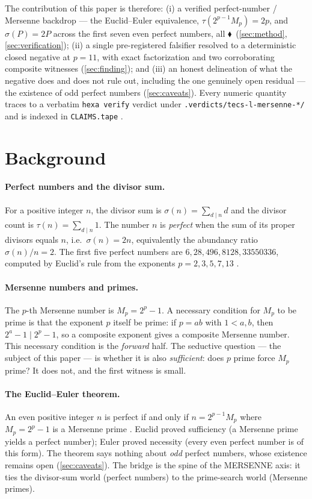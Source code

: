 \documentclass[11pt,a4paper]{article}
\newcommand{\tierF}{\textcolor{blue!60!black}{$\blacklozenge$}}   %
\newcommand{\sig}{\sigma}
\newcommand{\Mp}{M_p}
\theoremstyle{definition}
\begin{document}
The contribution of this paper is therefore: (i) a verified perfect-number /
Mersenne backdrop --- the Euclid--Euler equivalence, $\tau(2^{p-1}\Mp)=2p$, and
$\sig(P)=2P$ across the first seven even perfect numbers, all \tierF\
(\textsection\ref{sec:method}, \textsection\ref{sec:verification}); (ii) a single
pre-registered falsifier resolved to a deterministic closed negative at $p=11$,
with exact factorization and two corroborating composite witnesses
(\textsection\ref{sec:finding}); and (iii) an honest delineation of what the
negative does and does not rule out, including the one genuinely open residual
--- the existence of odd perfect numbers (\textsection\ref{sec:caveats}). Every
numeric quantity traces to a verbatim \texttt{hexa verify} verdict under
\texttt{.verdicts/tecs-l-mersenne-*/} and is indexed in \texttt{CLAIMS.tape}
\citep{tecs-l-claims}.

\section{Background}
\label{sec:background}

\paragraph{Perfect numbers and the divisor sum.} For a positive integer $n$, the
divisor sum is $\sig(n)=\sum_{d\mid n} d$ and the divisor count is
$\tau(n)=\sum_{d\mid n} 1$. The number $n$ is \emph{perfect} when the sum of its
proper divisors equals $n$, i.e.\ $\sig(n)=2n$, equivalently the abundancy ratio
$\sig(n)/n = 2$. The first five perfect numbers are
$6, 28, 496, 8128, 33550336$, computed by Euclid's rule from the exponents
$p = 2,3,5,7,13$ \citep{hardy-wright}.

\paragraph{Mersenne numbers and primes.} The $p$-th Mersenne number is
$\Mp = 2^p - 1$. A necessary condition for $\Mp$ to be prime is that the exponent
$p$ itself be prime: if $p = ab$ with $1<a,b$, then $2^a-1 \mid 2^p-1$, so a
composite exponent gives a composite Mersenne number. This necessary condition is
the \emph{forward} half. The seductive question --- the subject of this paper ---
is whether it is also \emph{sufficient}: does $p$ prime force $\Mp$ prime? It does
not, and the first witness is small.

\paragraph{The Euclid--Euler theorem.} An even positive integer $n$ is perfect if
and only if $n = 2^{p-1}\Mp$ where $\Mp = 2^p-1$ is a Mersenne prime
\citep{euclid,euler1849}. Euclid proved sufficiency (a Mersenne prime yields a
perfect number); Euler proved necessity (every even perfect number is of this
form). The theorem says nothing about \emph{odd} perfect numbers, whose existence
remains open (\textsection\ref{sec:caveats}). The bridge is the spine of the
MERSENNE axis: it ties the divisor-sum world (perfect numbers) to the
prime-search world (Mersenne primes).
\end{document}

